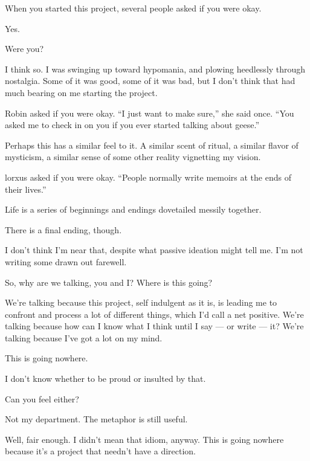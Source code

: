\begin{paracol}{2}
  \begin{leftcolumn}

\begin{ally}
When you started this project, several people asked if you were okay.
\end{ally}
Yes.

\begin{ally}
Were you?
\end{ally}
I think so. I was swinging up toward hypomania, and plowing heedlessly through nostalgia. Some of it was good, some of it was bad, but I don't think that had much bearing on me starting the project.

\begin{ally}
Robin asked if you were okay. ``I just want to make sure,'' she said once. ``You asked me to check in on you if you ever started talking about geese.''
\end{ally}
Perhaps this has a similar feel to it. A similar scent of ritual, a similar flavor of mysticism, a similar sense of some other reality vignetting my vision.

\begin{ally}
lorxus asked if you were okay. ``People normally write memoirs at the ends of their lives.''
\end{ally}
Life is a series of beginnings and endings dovetailed messily together.

\begin{ally}
There is a final ending, though.
\end{ally}
I don't think I'm near that, despite what passive ideation might tell me. I'm not writing some drawn out farewell.

\begin{ally}
So, why are we talking, you and I? Where is this going?
\end{ally}
We're talking because this project, self indulgent as it is, is leading me to confront and process a lot of different things, which I'd call a net positive. We're talking because how can I know what I think until I say --- or write --- it? We're talking because I've got a lot on my mind.

This is going nowhere.

\begin{ally}
I don't know whether to be proud or insulted by that.
\end{ally}
Can you feel either?

\begin{ally}
Not my department. The metaphor is still useful.
\end{ally}
Well, fair enough. I didn't mean that idiom, anyway. This is going nowhere because it's a project that needn't have a direction.


\end{leftcolumn}
\end{paracol}
